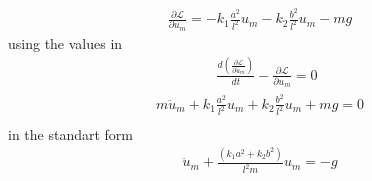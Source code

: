 \documentclass[]{report}
\begin{document}
\begin{eqnarray*}
\frac{\partial \mathcal{L}}{\partial {u}_m}= -k_1\frac{a^2}{l^2} u_m- k_2\frac{b^2}{l^2} u_m-mg
\end{eqnarray*}
using the values in 
\begin{eqnarray*}
\quad \frac{d \left(\frac{\partial \mathcal{L}}{\partial \dot{u}_m}\right)}{dt} -\frac{\partial \mathcal{L}}{\partial {u}_m}=0
\end{eqnarray*}
\begin{eqnarray*}
m \ddot{u}_m +k_1\frac{a^2}{l^2} u_m+ k_2\frac{b^2}{l^2} u_m+mg=0\\
\end{eqnarray*}
in the standart form
\begin{eqnarray*}
\ddot{u}_m +  \frac{\left(k_1 a^2+k_2 b^2\right)}{l^2 m} u_m= -g
\end{eqnarray*}
\end{document}
